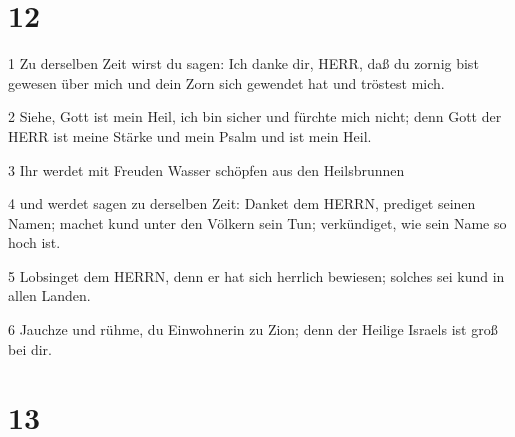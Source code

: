 \chapter{12}

\par 1 Zu derselben Zeit wirst du sagen: Ich danke dir, HERR, daß du zornig bist gewesen über mich und dein Zorn sich gewendet hat und tröstest mich.
\par 2 Siehe, Gott ist mein Heil, ich bin sicher und fürchte mich nicht; denn Gott der HERR ist meine Stärke und mein Psalm und ist mein Heil.
\par 3 Ihr werdet mit Freuden Wasser schöpfen aus den Heilsbrunnen
\par 4 und werdet sagen zu derselben Zeit: Danket dem HERRN, prediget seinen Namen; machet kund unter den Völkern sein Tun; verkündiget, wie sein Name so hoch ist.
\par 5 Lobsinget dem HERRN, denn er hat sich herrlich bewiesen; solches sei kund in allen Landen.
\par 6 Jauchze und rühme, du Einwohnerin zu Zion; denn der Heilige Israels ist groß bei dir.

\chapter{13}

